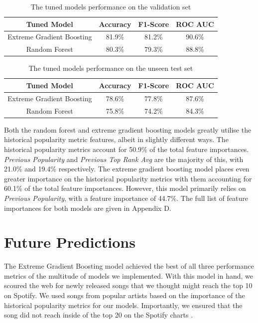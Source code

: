 \documentclass{article}
\begin{document}
\begin{table}[h]
\centering
\caption{The tuned models performance on the validation set}\label{table: 2}
\begin{tabular}{|c|c|c|c|}
\hline
Tuned Model & Accuracy & F1-Score & ROC AUC\\ 
\hline
 Extreme Gradient Boosting & 81.9\% & 81.2\% & 90.6\% \\
 Random Forest & 80.3\% & 79.3\% & 88.8\% \\
\hline
\end{tabular}
\end{table}

\begin{table}[h]
\centering
\caption{The tuned models performance on the unseen test set}\label{table: 3}
\begin{tabular}{|c|c|c|c|}
\hline
Tuned Model & Accuracy & F1-Score & ROC AUC\\ 
\hline
 Extreme Gradient Boosting & 78.6\% & 77.8\% & 87.6\% \\
 Random Forest & 75.8\% & 74.2\% & 84.3\% \\
\hline
\end{tabular}
\end{table}

Both the random forest and extreme gradient boosting models greatly utilise the historical popularity metric features, albeit in slightly different ways. The historical popularity metrics account for 50.9\% of the total feature importances. \textit{Previous Popularity} and \textit{Previous Top Rank Avg} are the majority of this, with 21.0\% and 19.4\% respectively. The extreme gradient boosting model places even greater importance on the historical popularity metrics with them accounting for 60.1\% of the total feature importances. However, this model primarily relies on \textit{Previous Popularity}, with a feature importance of 44.7\%. The full list of feature importances for both models are given in Appendix D.


\section{Future Predictions}
The Extreme Gradient Boosting model achieved the best of all three performance metrics of the multitude of models we implemented. With this model in hand, we scoured the web for newly released songs that we thought might reach the top 10 on Spotify. We used songs from popular artists based on the importance of the historical popularity metrics for our models. Importantly, we ensured that the song did not reach inside of the top 20 on the Spotify charts \cite{spotifyCharts}. 
\end{document}
